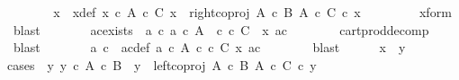 \begin{isabellebody}
\ \ \ \ \isamarkupfalse%
\ \isamarkupfalse%
\ x{\isacharprime}{\kern0pt}\ \ x{\isacharprime}{\kern0pt}{\isacharunderscore}{\kern0pt}def{\isacharcolon}{\kern0pt}\ {\isachardoublequoteopen}x{\isacharprime}{\kern0pt}\ {\isasymin}\isactrlsub c\ A\ {\isasymtimes}\isactrlsub c\ C{\isachardoublequoteclose}\ {\isachardoublequoteopen}x\ {\isacharequal}{\kern0pt}\ right{\isacharunderscore}{\kern0pt}coproj\ {\isacharparenleft}{\kern0pt}A\ {\isasymtimes}\isactrlsub c\ B{\isacharparenright}{\kern0pt}\ {\isacharparenleft}{\kern0pt}A\ {\isasymtimes}\isactrlsub c\ C{\isacharparenright}{\kern0pt}\ {\isasymcirc}\isactrlsub c\ x{\isacharprime}{\kern0pt}{\isachardoublequoteclose}\isanewline
\ \ \ \ \ \ \isamarkupfalse%
\ \ x{\isacharunderscore}{\kern0pt}form\ \isamarkupfalse%
\ blast\isanewline
\ \ \ \ \isamarkupfalse%
\ \isamarkupfalse%
\ ac{\isacharunderscore}{\kern0pt}exists{\isacharcolon}{\kern0pt}\ {\isachardoublequoteopen}{\isasymexists}\ a\ c{\isachardot}{\kern0pt}\ a\ {\isasymin}\isactrlsub c\ A\ {\isasymand}\ c\ {\isasymin}\isactrlsub c\ C\ {\isasymand}\ x{\isacharprime}{\kern0pt}\ {\isacharequal}{\kern0pt}{\isasymlangle}a{\isacharcomma}{\kern0pt}c{\isasymrangle}{\isachardoublequoteclose}\isanewline
\ \ \ \ \ \ \isamarkupfalse%
\ cart{\isacharunderscore}{\kern0pt}prod{\isacharunderscore}{\kern0pt}decomp\ \isamarkupfalse%
\ blast\isanewline
\ \ \ \ \isamarkupfalse%
\ \isamarkupfalse%
\ a\ c\ \ ac{\isacharunderscore}{\kern0pt}def{\isacharcolon}{\kern0pt}\ {\isachardoublequoteopen}a\ {\isasymin}\isactrlsub c\ A{\isachardoublequoteclose}\ {\isachardoublequoteopen}c\ {\isasymin}\isactrlsub c\ C{\isachardoublequoteclose}\ {\isachardoublequoteopen}x{\isacharprime}{\kern0pt}\ {\isacharequal}{\kern0pt}{\isasymlangle}a{\isacharcomma}{\kern0pt}c{\isasymrangle}{\isachardoublequoteclose}\isanewline
\ \ \ \ \ \ \isamarkupfalse%
\ blast\isanewline
\ \ \ \ \isamarkupfalse%
\ {\isachardoublequoteopen}x\ {\isacharequal}{\kern0pt}\ y{\isachardoublequoteclose}\ \ \isanewline
\ \ \ \ \isamarkupfalse%
{\isacharparenleft}{\kern0pt}cases\ {\isachardoublequoteopen}{\isasymexists}\ y{\isacharprime}{\kern0pt}{\isachardot}{\kern0pt}\ y{\isacharprime}{\kern0pt}\ {\isasymin}\isactrlsub c\ A\ {\isasymtimes}\isactrlsub c\ B\ {\isasymand}\ y\ {\isacharequal}{\kern0pt}\ left{\isacharunderscore}{\kern0pt}coproj\ {\isacharparenleft}{\kern0pt}A\ {\isasymtimes}\isactrlsub c\ B{\isacharparenright}{\kern0pt}\ {\isacharparenleft}{\kern0pt}A\ {\isasymtimes}\isactrlsub c\ C{\isacharparenright}{\kern0pt}\ {\isasymcirc}\isactrlsub c\ y{\isacharprime}{\kern0pt}{\isachardoublequoteclose}{\isacharparenright}{\kern0pt}\isanewline

\end{isabellebody}
